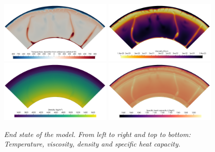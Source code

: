 \begin{figure}
  \includegraphics[width=0.48\textwidth]{cookbooks/steinberger/doc/temperature.png}
  \includegraphics[width=0.48\textwidth]{cookbooks/steinberger/doc/viscosity.png}
  \includegraphics[width=0.48\textwidth]{cookbooks/steinberger/doc/density.png}
  \includegraphics[width=0.48\textwidth]{cookbooks/steinberger/doc/specific_heat.png}
  \caption{\it End state of the model. From left to right and top to bottom: Temperature, viscosity, density and specific heat capacity.}
  \label{fig:steinberger-end-state}
\end{figure}


